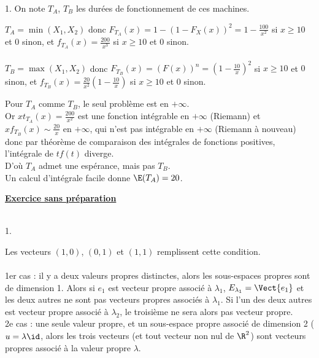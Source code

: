 \documentclass[11pt]{article}%
\begin{document}
\begin{exercice}
\begin{noliste}{1.}
 On note $T_{A}$, $T_{B}$ les durées de fonctionnement de ces machines.

 \item $T_{A} = \min (X_{1}, X_{2})$ donc $F_{T_{A}} (x) = 1 - \left( 1
- F_{X}(x) \right)^{2} = 1 - \frac{100}{x^{2}}$ si $x \geq 10$ et $0$
sinon, et $f_{T_{A}} (x) = \frac{200}{x^{3}}$ si $x \geq 10$ et $0$
sinon. \\
\\
 $T_{B} = \max (X_{1}, X_{2})$ donc $F_{T_{B}} (x) = ( F(x) )^{n} =
\left( 1 - \frac{10}{x} \right)^{2}$ si $x \geq 10$ et $0$ sinon, et $
f_{T_{B}} (x) = \frac{ 20}{x^{2}} \left( 1 - \frac{10}{x} \right)$ si
$x \geq 10$ et $0$ sinon. \\

 \item Pour $T_{A}$ comme $T_{B}$, le seul problème est en $ + \infty$.
\\
 Or $x t_{T_{A}} (x) = \frac{200}{x^{2}}$ est une fonction intégrable
en $ + \infty$ (Riemann) et $x f_{T_{B}} (x) \sim \frac{20}{x}$ en $ +
\infty$, qui n'est pas intégrable en $ + \infty$ (Riemann à nouveau)
donc par théorème de comparaison des intégrales de fonctions positives,
l'intégrale de $t f(t)$ diverge. \\
 D'où $T_{A}$ admet une espérance, mais pas $T_{B}$. \\
 Un calcul d'intégrale facile donne $\E(T_{A}) = 20$.
 \end{noliste}

 

 \noindent \textbf{\underline{Exercice sans préparation}} \\
\\
 \begin{noliste}{1.}
 \setlength{\itemsep}{4mm}
 \item Les vecteurs $(1,0)$, $(0,1)$ et $(1,1)$ remplissent cette
condition. \\
\\
 1er cas : il y a deux valeurs propres distinctes, alors les
sous-espaces propres sont de dimension 1. Alors si $e_{1}$ est vecteur
propre associé à $\lambda_{1}$, $E_{\lambda_{1}} = \Vect{ e_{1}}$ et
les deux autres ne sont pas vecteurs propres associés à $\lambda_{1}$.
Si l'un des deux autres est vecteur propre associé à $\lambda_{2}$, le
troisième ne sera alors pas vecteur propre. \\
 2e cas : une seule valeur propre, et un sous-espace propre associé de
dimension 2 ($u = \lambda \id$, alors les trois vecteurs (et tout
vecteur non nul de $\R^{2}$) sont vecteurs propres associé à la valeur
propre $\lambda$. \\


\end{noliste}
\end{exercice}
\end{document}
